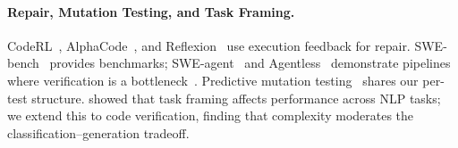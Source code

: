 \paragraph{Repair, Mutation Testing, and Task Framing.}
CodeRL~\cite{le2022coderl}, AlphaCode~\cite{li2022alphacode,alphacode2023team}, and Reflexion~\cite{shinn2023reflexion} use execution feedback for repair. SWE-bench~\cite{jimenez2024swebench,chowdhury2024swebenchverified} provides benchmarks; SWE-agent~\cite{yang2024sweagent} and Agentless~\cite{xia2024agentless} demonstrate pipelines where verification is a bottleneck~\cite{yang2025aprsurvey}. Predictive mutation testing~\cite{tufano2019predictive,kim2022predictive,wang2024llmmutation,jain2023contextual} shares our per-test structure. \citet{raffel2020t5} showed that task framing affects performance across NLP tasks; we extend this to code verification, finding that complexity moderates the classification--generation tradeoff.
